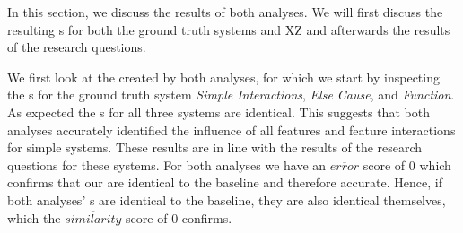 In this section, we discuss the results of both analyses. We will first discuss the resulting {\perfInfluenceModel}s 
for both the ground truth systems and \textsc{XZ} and afterwards the results of the research questions.

We first look at the {\perfInfluenceModel} created by both analyses, 
for which we start by inspecting the {\perfInfluenceModel}s for the ground truth system \emph{Simple Interactions}, 
\emph{Else Cause}, and \emph{Function}. As expected the {\perfInfluenceModel}s for all three systems are identical. 
This suggests that both analyses accurately identified the influence of all features and feature interactions for simple systems.
These results are in line with the results of the research questions for these systems. For both analyses
we have an $\overline{error}$ score of $0$ which confirms that our {\perfInfluenceModel} are identical to the baseline and therefore 
accurate. Hence, if both analyses' {\perfInfluenceModel}s are identical to the baseline, they are also identical themselves,
which the $\overline{similarity}$ score of $0$ confirms.


